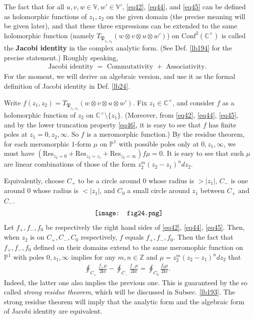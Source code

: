 \documentclass[12pt,a4paper,notitlepage]{article}
\theoremstyle{definition}
\theoremstyle{plain}
\newcommand{\fk}{\mathfrak}
\newcommand{\Conf}{\mathrm{Conf}}
\newcommand{\Res}{\mathrm{Res}}
\newcommand{\im}{\mathbf{i}}
\newcommand{\Vbb}{\mathbb V}
\newcommand{\Cbb}{\mathbb C}
\newcommand{\Zbb}{\mathbb Z}
\newcommand{\Pbb}{\mathbb P}
\numberwithin{equation}{section}
\begin{document}
The fact that for all $u,v,w\in\Vbb,w'\in\Vbb'$, \eqref{eq42}, \eqref{eq44}, and \eqref{eq45} can be defined as holomorphic functions of $z_1,z_2$ on the given domain (the precise meaning will be given later), and that these three expressions can be extended to the same holomorphic function (namely $T_{\fk P_{z_1,z_2}}(w\otimes v\otimes u\otimes w')$) on $\Conf^2(\Cbb^\times)$ is called the \textbf{Jacobi identity} in the complex analytic form. (See Def. \ref{lb194} for the precise statement.) Roughly speaking,
\begin{align}
\text{Jacobi identity $=$ Commutativity $+$ Associativity}.\label{eq73}
\end{align}
For the moment, we will derive an algebraic version, and use it as the formal definition of Jacobi identity in Def. \ref{lb24}. 

Write $f(z_1,z_2)=T_{\fk P_{z_1,z_2}}(w\otimes v\otimes u\otimes w')$.  Fix $z_1\in \Cbb^\times$, and consider $f$ as a holomorphic function of $z_2$ on $\Cbb^\times\setminus\{z_1\}$. (Moreover, from \eqref{eq42}, \eqref{eq44}, \eqref{eq45}, and by the lower truncation property \eqref{eq46}, it is easy to see that $f$ has finite poles at $z_1=0,z_2,\infty$. So $f$ is a meromorphic function.) By the residue theorem, for each meromorphic  $1$-form $\mu$ on $\Pbb^1$ with possible poles only at $0,z_1,\infty$, we must have $(\Res_{z_2=0}+\Res_{z_2=z_1}+\Res_{z_2=\infty})f\mu=0$. It is easy to see that such $\mu$ are linear combinations of those of the form $z_2^m(z_2-z_1)^ndz_2$.

Equivalently, choose $C_+$ to be a circle around $0$ whose radius is  $>|z_1|$, $C_-$ is one around $0$ whose radius is $<|z_1|$, and $C_0$  a small circle around $z_1$ between $C_+$ and $C_-$. 
\begin{align*}
	\vcenter{\hbox{{
				\texttt{[image: fig24.png]}}}}
\end{align*}
Let $f_+,f_-,f_0$ be respectively the right hand sides of \eqref{eq42}, \eqref{eq44}, \eqref{eq45}. Then, when $z_2$ is on $C_+,C_-,C_0$ respectively, $f$ equals $f_+,f_-,f_0$. Then the fact that $f_+,f_-,f_0$ defined on their domains extend to the same meromophic function on $\Pbb^1$ with poles $0,z_1,\infty$ implies for any $m,n\in\Zbb$ and $\mu=z_2^m(z_2-z_1)^ndz_2$ that
\begin{align}
	\oint_{C_+}\frac{f_+\mu}{2\im\pi} -\oint_{C_-}\frac{f_-\mu}{2\im\pi}=\oint_{C_0} \frac{f_0\mu}{2\im\pi}.\label{eq48}
\end{align}
Indeed, the latter one also implies the previous one. This is guaranteed by the so called \emph{strong residue theorem}, which will be discussed in Subsec. \ref{lb193}. The strong residue theorem will imply that the analytic form and the algebraic form of Jacobi identity are equivalent.
\end{document}

